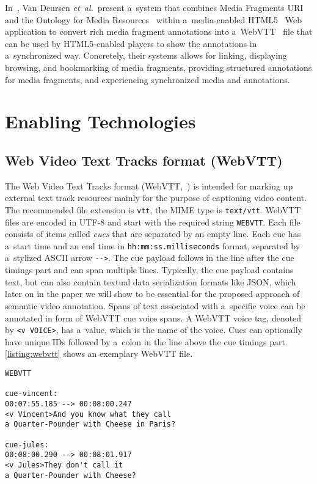 \documentclass{sig-alternate}
\begin{document}
In~\cite{vandeursen2012mediafragmentannotations},
Van Deursen \emph{et~al.}\ present a~system
that combines Media Fragments URI~\cite{troncy2012mediafragments} and the Ontology for Media Resources~\cite{lee2012mediaontology}
within a~media-enabled HTML5~\cite{berjon2013html5}
Web application to convert rich media fragment annotations
into a~WebVTT~\cite{pfeiffer2013webvtt} file
that can be used by HTML5-enabled players
to show the annotations in a~synchronized way.
Concretely, their systems allows for linking, displaying
browsing, and bookmarking of media fragments,
providing structured annotations for media fragments,
and experiencing synchronized media and annotations.

\section{Enabling Technologies}

\subsection{Web Video Text Tracks format (WebVTT)}

The Web Video Text Tracks format (WebVTT,~\cite{pfeiffer2013webvtt})
is intended for marking up external text track resources mainly
for the purpose of captioning video content.
The recommended file extension is \texttt{vtt},
the MIME type is \texttt{text/vtt}.
WebVTT files are encoded in UTF-8 and
start with the required string \texttt{WEBVTT}.
Each file consists of items called \emph{cues}
that are separated by an empty line.
Each cue has a~start time and an end time in
\texttt{hh:mm:ss.milliseconds} format,
separated by a~stylized ASCII arrow \texttt{-}\texttt{->}.
The cue payload follows in the line after the cue timings part
and can span multiple lines.
Typically, the cue payload contains text,
but can also contain textual data serialization formats like JSON,
which later on in the paper we will show to be essential
for the proposed approach of semantic video annotation.
Spans of text associated with a~specific voice can be annotated
in form of WebVTT cue voice spans.
A WebVTT voice tag, denoted by \texttt{<v VOICE>}, has a~value,
which is the name of the voice.
Cues can optionally have unique IDs
followed by a~colon in the line
above the cue timings part.
\autoref{listing:webvtt} shows an exemplary WebVTT file.

\begin{lstlisting}[caption={Sample WebVTT file with two cues
    with the IDs \texttt{cue-vincent} and
    \texttt{cue-jules} respectively},
  label=listing:webvtt, float=h!]
WEBVTT

cue-vincent:
00:07:55.185 --> 00:08:00.247
<v Vincent>And you know what they call
a Quarter-Pounder with Cheese in Paris?

cue-jules:
00:08:00.290 --> 00:08:01.917
<v Jules>They don't call it
a Quarter-Pounder with Cheese?
\end{lstlisting}
\end{document}
